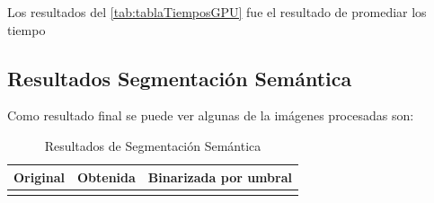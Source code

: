 Los resultados del \tablename \ref{tab:tablaTiemposGPU} fue el resultado de promediar los tiempo
\subsection{Resultados Segmentación Semántica}

Como resultado final se puede ver algunas de la imágenes procesadas son:

\begin{table}[H]
\caption{Resultados de Segmentación Semántica }

\begin{tabular}{|M{0.3\textwidth}|M{0.3\textwidth}|M{0.3\textwidth}|}
 \hline Original & Obtenida & Binarizada por umbral \\
 \hline
\medskip  {}
 &\medskip {}
  & \medskip\medskip {}
  
  \\


\end{tabular}
\end{table}
